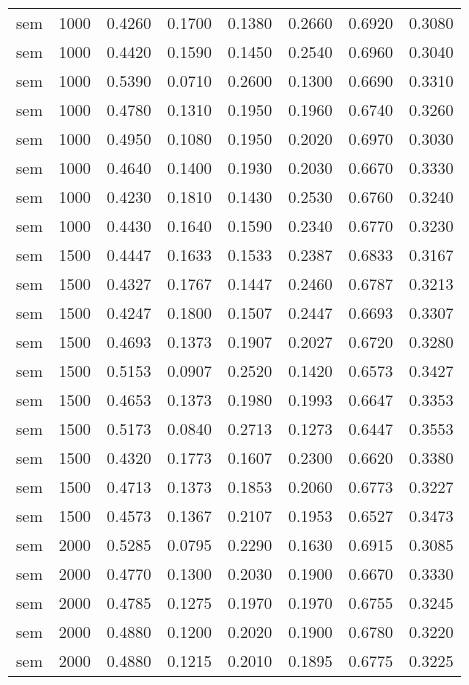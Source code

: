 \begin{table}[h!]
\begin{tabularx}{\textwidth}{cccccccc}
		sem      & 1000 & 0.4260 & 0.1700 & 0.1380 & 0.2660 & 0.6920 & 0.3080 \\
		sem      & 1000 & 0.4420 & 0.1590 & 0.1450 & 0.2540 & 0.6960 & 0.3040 \\
		sem      & 1000 & 0.5390 & 0.0710 & 0.2600 & 0.1300 & 0.6690 & 0.3310 \\
		sem      & 1000 & 0.4780 & 0.1310 & 0.1950 & 0.1960 & 0.6740 & 0.3260 \\
		sem      & 1000 & 0.4950 & 0.1080 & 0.1950 & 0.2020 & 0.6970 & 0.3030 \\
		sem      & 1000 & 0.4640 & 0.1400 & 0.1930 & 0.2030 & 0.6670 & 0.3330 \\
		sem      & 1000 & 0.4230 & 0.1810 & 0.1430 & 0.2530 & 0.6760 & 0.3240 \\
		sem      & 1000 & 0.4430 & 0.1640 & 0.1590 & 0.2340 & 0.6770 & 0.3230 \\
		sem      & 1500 & 0.4447 & 0.1633 & 0.1533 & 0.2387 & 0.6833 & 0.3167 \\
		sem      & 1500 & 0.4327 & 0.1767 & 0.1447 & 0.2460 & 0.6787 & 0.3213 \\
		sem      & 1500 & 0.4247 & 0.1800 & 0.1507 & 0.2447 & 0.6693 & 0.3307 \\
		sem      & 1500 & 0.4693 & 0.1373 & 0.1907 & 0.2027 & 0.6720 & 0.3280 \\
		sem      & 1500 & 0.5153 & 0.0907 & 0.2520 & 0.1420 & 0.6573 & 0.3427 \\
		sem      & 1500 & 0.4653 & 0.1373 & 0.1980 & 0.1993 & 0.6647 & 0.3353 \\
		sem      & 1500 & 0.5173 & 0.0840 & 0.2713 & 0.1273 & 0.6447 & 0.3553 \\
		sem      & 1500 & 0.4320 & 0.1773 & 0.1607 & 0.2300 & 0.6620 & 0.3380 \\
		sem      & 1500 & 0.4713 & 0.1373 & 0.1853 & 0.2060 & 0.6773 & 0.3227 \\
		sem      & 1500 & 0.4573 & 0.1367 & 0.2107 & 0.1953 & 0.6527 & 0.3473 \\
		sem      & 2000 & 0.5285 & 0.0795 & 0.2290 & 0.1630 & 0.6915 & 0.3085 \\
		sem      & 2000 & 0.4770 & 0.1300 & 0.2030 & 0.1900 & 0.6670 & 0.3330 \\
		sem      & 2000 & 0.4785 & 0.1275 & 0.1970 & 0.1970 & 0.6755 & 0.3245 \\
		sem      & 2000 & 0.4880 & 0.1200 & 0.2020 & 0.1900 & 0.6780 & 0.3220 \\
		sem      & 2000 & 0.4880 & 0.1215 & 0.2010 & 0.1895 & 0.6775 & 0.3225 \\

\end{tabularx}
\end{table}
